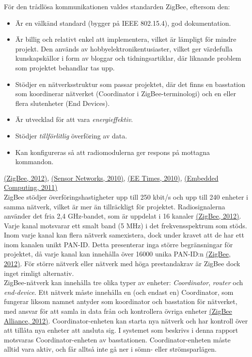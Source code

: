 \documentclass[a4paper,11pt]{article}
\begin{document}
För den trådlösa kommunikationen valdes standarden ZigBee, eftersom den:
	
	\begin{itemize}
    	\item Är en välkänd standard (bygger på IEEE 802.15.4), god dokumentation.
    	\item Är billig och relativt enkel att implementera, vilket är lämpligt för mindre projekt. Den används av hobbyelektronikentusiaster, vilket ger värdefulla kunskapskällor i form av bloggar och tidningsartiklar, där liknande problem som projektet behandlar tas upp.
    	\item Stödjer en nätverksstruktur som passar projektet, där det finns en basstation som koordinerar nätverket (Coordinator i ZigBee-terminologi) och en eller flera slutenheter (End Devices).
    	\item Är utvecklad för att vara {\it energieffektiv}.
    	\item Stödjer {\it tillförlitlig} överföring av data.
    	\item Kan konfigureras så att radiomodulerna ger respons på mottagna kommandon.
    	\end{itemize}
\hyperref[zigbee]{(ZigBee, 2012)}, \hyperref[sensornetworks]{(Sensor Networks, 2010)}, \hyperref[eetimes]{(EE Times, 2010)}, \hyperref[embedded]{(Embedded Computing, 2011)}\\
    	
ZigBee stödjer överföringshastigheter upp till 250 kbit/s och upp till 240 enheter i samma nätverk, vilket är mer än tillräckligt för projektet. Radiosignalerna använder det fria 2,4 GHz-bandet, som är uppdelat i 16 kanaler \hyperref[zigbee]{(ZigBee, 2012)}. Varje kanal motsvarar ett smalt band (5 MHz) i det frekvensspektrum som stöds. Inom varje kanal kan flera nätverk samexistera, dock under kravet att de har ett inom kanalen unikt PAN-ID. Detta presenterar inga större begränsningar för projektet, då varje kanal kan innehålla över 16000 unika PAN-ID:n \hyperref[zigbee]{(ZigBee, 2012)}. För större nätverk eller nätverk med höga prestandakrav är ZigBee dock inget rimligt alternativ. \\

ZigBee-nätverk kan innehålla tre olika typer av enheter: {\it Coordinator}, {\it router} och {\it end-device}. Ett nätverk måste innehålla en (och endast en) Coordinator, som fungerar liksom namnet antyder som koordinator och basstation för nätverket, med ansvar för att samla in data från och kontrollera övriga enheter \hyperref[zigbee]{(ZigBee Alliance, 2012)}. Coordinator-enheten kan starta nya nätverk och har kontroll över att tillåta nya enheter att ansluta sig. I systemet som beskrivs i denna rapport motsvaras Coordinator-enheten av basstationen. Coordinator-enheten måste alltid vara aktiv, och får alltså inte gå ner i sömn- eller strömsparlägen. \\
\end{document}
